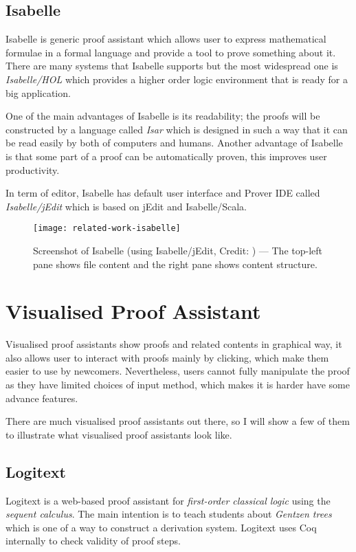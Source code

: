 \documentclass[master.tex]{subfiles}
\begin{document}
\subsection{Isabelle}

Isabelle\supercite{isabelle-official-website} is generic proof assistant which
allows user to express mathematical formulae in a formal language and provide a
tool to prove something about it. There are many systems that Isabelle supports
but the most widespread one is \emph{Isabelle/HOL} which provides a higher order
logic environment that is ready for a big application.

One of the main advantages of Isabelle is its readability; the proofs will be
constructed by a language called \emph{Isar} which is designed in such a way
that it can be read easily by both of computers and humans. Another advantage of
Isabelle is that some part of a proof can be automatically proven, this improves
user productivity.

In term of editor, Isabelle has default user interface and Prover IDE called
\emph{Isabelle/jEdit} which is based on jEdit and Isabelle/Scala.

\begin{figure}[H]
    \centering
    \texttt{[image: related-work-isabelle]}
    \caption{Screenshot of Isabelle (using Isabelle/jEdit, Credit:
      \cite{isabelle-official-website}) --- The top-left pane shows file content
      and the right pane shows content structure.}
\label{fig:related-work-isabelle}
\end{figure}

\section{Visualised Proof Assistant}
Visualised proof assistants show proofs and related contents in graphical way,
it also allows user to interact with proofs mainly by clicking, which make them
easier to use by newcomers. Nevertheless, users cannot fully manipulate the
proof as they have limited choices of input method, which makes it is harder
have some advance features.

There are much visualised proof assistants out there, so I will show a few of
them to illustrate what visualised proof assistants look like.

\subsection{Logitext}
Logitext\supercite{logitext-official-website} is a web-based proof assistant for
\emph{first-order classical logic} using the \emph{sequent calculus}. The main
intention is to teach students about \emph{Gentzen trees} which is one of a way
to construct a derivation system. Logitext uses Coq internally to check validity
of proof steps.
\end{document}
